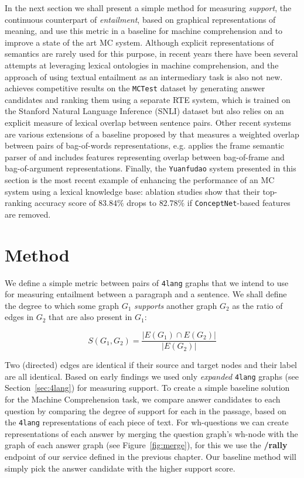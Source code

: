 In the next section we shall present a simple method for measuring
\textit{support}, the continuous counterpart of \textit{entailment},
based on graphical representations of meaning, and use this metric in a
baseline for machine comprehension and to improve a state of the art
MC system.
Although explicit representations of semantics are rarely used for this purpose,
in recent years there have been several attempts at leveraging lexical
ontologies in machine comprehension, and the approach of using textual
entailment as an intermediary task is also not new. \cite{Wang:2016}
achieves competitive results on the \texttt{MCTest} dataset
\cite{Richardson:2013} by generating
answer candidates and ranking them using a separate RTE system, which is
trained on the Stanford Natural Language Inference (SNLI) dataset
\cite{Bowman:2015}
but also relies on an explicit measure of lexical overlap between sentence
pairs. Other recent systems are various extensions of a baseline
proposed by \cite{Richardson:2013} that measures a weighted overlap
between pairs of bag-of-words representations, e.g. \cite{Wang:2015b}
applies the frame
semantic parser of \cite{Das:2010} and includes features representing
overlap between bag-of-frame and bag-of-argument representations.
Finally, the \texttt{Yuanfudao} system presented in this section is the most
recent example of enhancing the performance of an MC system using a lexical
knowledge base: ablation studies show that their top-ranking accuracy score of
$83.84\%$ drops to $82.78\%$ if \texttt{ConceptNet}-based features are removed.

\section{Method}
\label{sec:method}

We define a simple metric between pairs of \texttt{4lang} graphs that
we intend to use for measuring entailment between a paragraph and a
sentence. We shall define the degree to which some graph $G_1$
\textit{supports} another graph $G_2$ as the ratio of edges in $G_2$
that are also present in $G_1$:

\[ S(G_1, G_2) =\frac{|E(G_1)\cap E(G_2)|}{|E(G_2)|}\]

Two (directed) edges are identical if their source
and target nodes and their label are all identical. Based on early
findings we used only \textit{expanded} \texttt{4lang} graphs (see
Section~\ref{sec:4lang}) for measuring support. 
To create a simple baseline solution for the Machine Comprehension task,
we compare answer candidates to each question by comparing the degree of
support for each in the passage, based on the \texttt{4lang} representations of
each piece of text. For wh-questions we can create representations of
each answer by merging the question graph's wh-node with the graph of
each answer graph (see Figure~\ref{fig:merge}), for this we use the \textbf{/rally} endpoint of our service defined in the previous chapter. Our baseline method will simply
pick the answer candidate with the higher support score.

